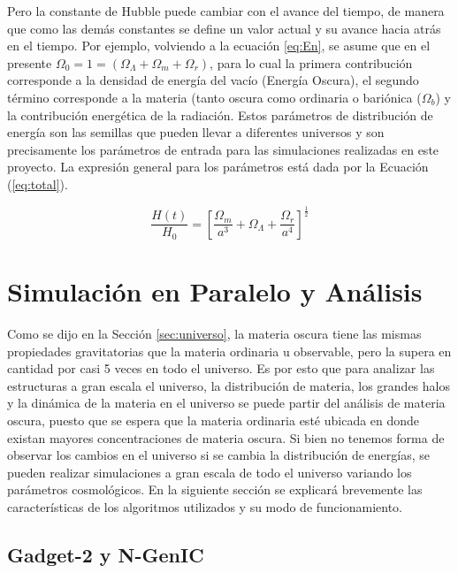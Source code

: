 Pero la constante de Hubble puede cambiar con el avance del tiempo, de manera que como las demás constantes se define un valor actual y su avance hacia atrás en el tiempo. Por ejemplo, volviendo a la ecuación \ref{eq:En}, se asume que en el presente $\Omega_0=1=(\Omega_\Lambda+\Omega_m+\Omega_r)$, para lo cual la primera contribución corresponde a la densidad de energía del vacío (Energía Oscura), el segundo término corresponde a la materia (tanto oscura como ordinaria o bariónica ($\Omega_b$) y la contribución energética de la radiación. Estos parámetros de distribución de energía son las semillas que pueden llevar a diferentes universos y son precisamente los parámetros de entrada para las simulaciones realizadas en este proyecto. La expresión general para los parámetros está dada por la Ecuación (\ref{eq:total}).

\begin{equation}
\frac{H(t)}{H_0}=\left[\frac{\Omega_m}{a^3}+\Omega_\Lambda+\frac{\Omega_r}{a^4}\right]^{\frac{1}{2}}
\label{eq:total}
\end{equation}


\section{Simulación en Paralelo y Análisis}
Como se dijo en la Sección \ref{sec:universo}, la materia oscura tiene las mismas propiedades gravitatorias que la materia ordinaria u observable, pero la supera en cantidad por casi 5 veces en todo el universo. Es por esto que para analizar las estructuras a gran escala el universo, la distribución de materia, los grandes halos y la dinámica de la materia en el universo se puede partir del análisis de materia oscura, puesto que se espera que la materia ordinaria esté ubicada en donde existan mayores concentraciones de materia oscura. Si bien no tenemos forma de observar los cambios en el universo si se cambia la distribución de energías, se pueden realizar simulaciones a gran escala de todo el universo variando los parámetros cosmológicos. En la siguiente sección se explicará brevemente las características de los algoritmos utilizados y su modo de funcionamiento.


\subsection{Gadget-2 y N-GenIC}

